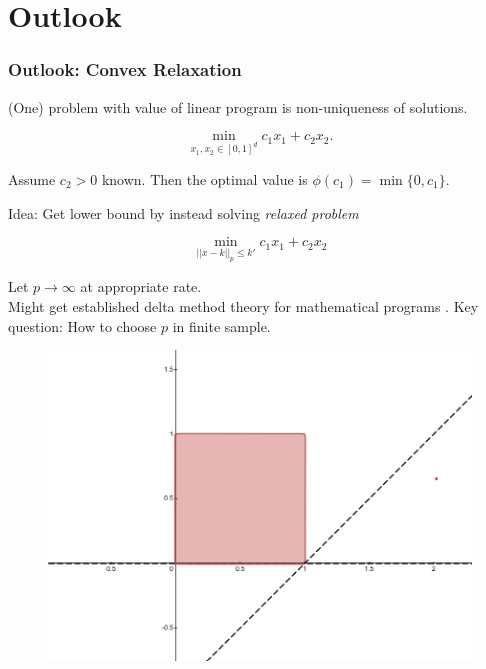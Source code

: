 \documentclass[11pt, aspectratio=169]{beamer}
\begin{document}
\section{Outlook}

\begin{frame}
    \frametitle{Outlook: Convex Relaxation}

    (One) problem with value of linear program is non-uniqueness of solutions.

    \begin{equation*}
        \min_{x_1, x_2\in[0,1]^d} c_1 x_1 + c_2 x_2.
    \end{equation*}

    \vspace{0.5cm}
    Assume $c_2 > 0$ known. Then the optimal value is $\phi(c_1) = \min\{0, c_1\}$.

    \vspace{0.5cm}
    Idea: Get lower bound by instead solving \textit{relaxed problem}

    \begin{equation*}
        \min_{||x-k||_p\leq k'} c_1x_1 + c_2x_2
    \end{equation*}

    Let $p\to\infty$ at appropriate rate.\\
    Might get established delta method theory for mathematical programs \citep{shapiro1991asymptotic}.
    Key question: How to choose $p$ in finite sample.


\end{frame}

\begin{frame}
    \begin{figure}
        \includegraphics[height=0.9\textheight]{desmos_only_box.png}
    \end{figure}
\end{frame}
\end{document}
